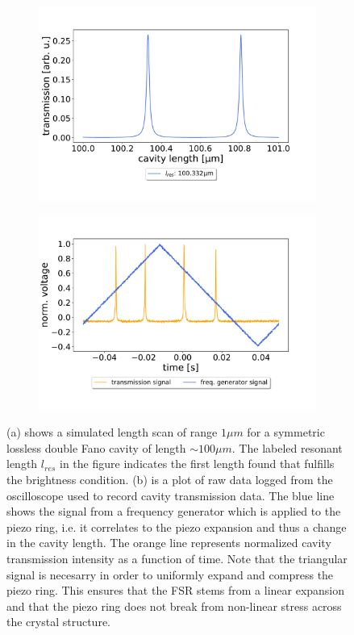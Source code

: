 \begin{figure}[h!]
    \centering
    \begin{subfigure}[b]{0.49\textwidth}
        \includegraphics[width=\textwidth]{figures/length_scan_symmetric_lossless.pdf}
        \caption{}
        \label{fig:length_scan_sim}
    \end{subfigure}
    \begin{subfigure}[b]{0.49\textwidth}
        \includegraphics[width=\textwidth]{figures/scope_screenshot.pdf}
        \caption{}
        \label{fig:lenght_scan_scope}
    \end{subfigure}
    \caption{(a) shows a simulated length scan  of range $1 \mu m$ for a symmetric lossless double Fano cavity of length $\sim 100 \mu m$. The labeled resonant length $l_{res}$ in the figure indicates the first length found that fulfills the brightness condition. (b) is a plot of raw data logged from the oscilloscope used to record cavity transmission data. The blue line shows the signal from a frequency generator which is applied to the piezo ring, i.e. it correlates to the piezo expansion and thus a change in the cavity length. The orange line represents normalized cavity transmission intensity as a function of time. Note that the triangular signal is necesarry in order to uniformly expand and compress the piezo ring. This ensures that the FSR stems from a linear expansion and that the piezo ring does not break from non-linear stress across the crystal structure.}
    \label{fig:length_scan}
\end{figure}


